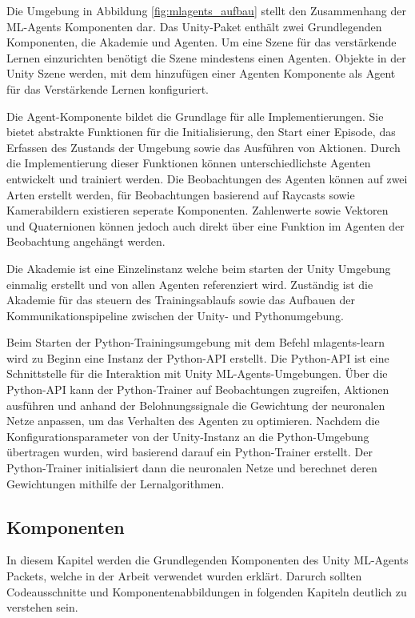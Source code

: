 Die Umgebung in Abbildung \ref{fig:mlagents_aufbau} stellt den Zusammenhang der ML-Agents Komponenten dar. Das Unity-Paket enthält zwei Grundlegenden Komponenten, die Akademie und Agenten. Um eine Szene für das verstärkende Lernen einzurichten benötigt die Szene mindestens einen Agenten. Objekte in der Unity Szene werden, mit dem hinzufügen einer Agenten Komponente als Agent für das Verstärkende Lernen konfiguriert.

Die Agent-Komponente bildet die Grundlage für alle Implementierungen. Sie bietet abstrakte Funktionen für die Initialisierung, den Start einer Episode, das Erfassen des Zustands der Umgebung sowie das Ausführen von Aktionen. Durch die Implementierung dieser Funktionen können unterschiedlichste Agenten entwickelt und trainiert werden. Die Beobachtungen des Agenten können auf zwei Arten erstellt werden, für Beobachtungen basierend auf Raycasts sowie Kamerabildern existieren seperate Komponenten. Zahlenwerte sowie Vektoren und Quaternionen können jedoch auch direkt über eine Funktion im Agenten der Beobachtung angehängt werden.

Die Akademie ist eine Einzelinstanz welche beim starten der Unity Umgebung einmalig erstellt und von allen Agenten referenziert wird. Zuständig ist die Akademie für das steuern des Trainingsablaufs sowie das Aufbauen der Kommunikationspipeline zwischen der Unity- und Pythonumgebung.

Beim Starten der Python-Trainingsumgebung mit dem Befehl mlagents-learn wird zu Beginn eine Instanz der Python-API erstellt. Die Python-API ist eine Schnittstelle für die Interaktion mit Unity ML-Agents-Umgebungen. Über die Python-API kann der Python-Trainer auf Beobachtungen zugreifen, Aktionen ausführen und anhand der Belohnungssignale die Gewichtung der neuronalen Netze anpassen, um das Verhalten des Agenten zu optimieren. Nachdem die Konfigurationsparameter von der Unity-Instanz an die Python-Umgebung übertragen wurden, wird basierend darauf ein Python-Trainer erstellt. Der Python-Trainer initialisiert dann die neuronalen Netze und berechnet deren Gewichtungen mithilfe der Lernalgorithmen.

\subsection{Komponenten}
In diesem Kapitel werden die Grundlegenden Komponenten des Unity ML-Agents Packets, welche in der Arbeit verwendet wurden erklärt. Darurch sollten Codeausschnitte und Komponentenabbildungen in folgenden Kapiteln deutlich zu verstehen sein.

